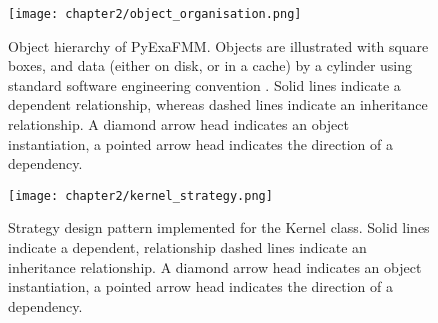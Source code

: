 \begin{figure}
    \centering
    {\texttt{[image: chapter2/object\_organisation.png]}}
    \vspace{0pt}
    \caption{Object hierarchy of \gls{PyExaFMM}. Objects are illustrated with
    square boxes, and data (either on disk, or in a cache) by a cylinder using
    standard software engineering convention \cite{Gamma:1994:Addison}. Solid
    lines indicate a dependent relationship, whereas dashed lines
    indicate an inheritance relationship. A diamond arrow head indicates an
    object instantiation, a pointed arrow head indicates the direction of a
    dependency.}
    \label{fig:2_5_architecture}
\end{figure}

\begin{figure}
    \centering
    {\texttt{[image: chapter2/kernel\_strategy.png]}}
    \vspace{0pt}
    \caption{Strategy design pattern implemented for the Kernel class.  Solid
    lines indicate a dependent, relationship dashed lines
    indicate an inheritance relationship. A diamond arrow head indicates an
    object instantiation, a pointed arrow head indicates the direction of a
    dependency.}
    \label{fig:2_5_strategy_kernel}
\end{figure}

